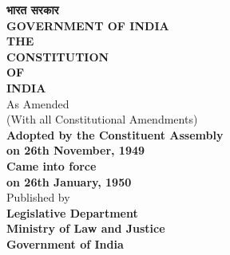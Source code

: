 
\begin{titlepage}
\centering

\vspace*{2cm}

{\Large \textbf{भारत सरकार}} \\[0.5cm]
{\Large \textbf{GOVERNMENT OF INDIA}} \\[2cm]

{\Huge \textbf{THE}} \\[0.3cm]
{\Huge \textbf{CONSTITUTION}} \\[0.3cm]
{\Huge \textbf{OF}} \\[0.3cm]
{\Huge \textbf{INDIA}} \\[2cm]

{\Large As Amended} \\[0.5cm]
{\large (With all Constitutional Amendments)} \\[3cm]

{\large \textbf{Adopted by the Constituent Assembly}} \\[0.3cm]
{\large \textbf{on 26th November, 1949}} \\[1cm]

{\large \textbf{Came into force}} \\[0.3cm]  
{\large \textbf{on 26th January, 1950}} \\[2cm]

\vfill
{\large Published by} \\[0.2cm]
{\large \textbf{Legislative Department}} \\[0.2cm]
{\large \textbf{Ministry of Law and Justice}} \\[0.2cm]
{\large \textbf{Government of India}} \\[1cm]

{\large \textbf{\the\year}}

\end{titlepage}

\cleardoublepage